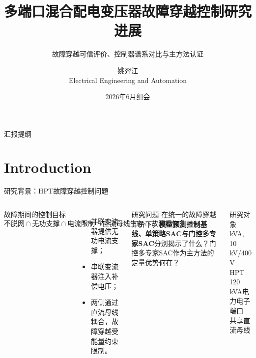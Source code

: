 \documentclass[10pt,aspectratio=169,mathserif]{beamer}
\title[HPT故障穿越控制]{多端口混合配电变压器故障穿越控制研究进展}
\subtitle{故障穿越可信评价、控制器谱系对比与主方法认证}
\author[Yijiang Yao]{姚羿江\\\medskip
{\small Electrical Engineering and Automation}}
\institute[ZJU]{浙江大学 \quad ZJU-UIUC Institute}
\date[June 2026]{2026年6月组会}
\begin{document}
\begin{frame}
  \titlepage
\end{frame}

\begin{frame}{汇报提纲}
  \tableofcontents
\end{frame}
\section{Introduction}

\begin{frame}{研究背景：HPT故障穿越控制问题}
\begin{columns}[T,onlytextwidth]
\begin{block}{故障期间的控制目标}
\[
\boxed{\text{不脱网}}
\cap
\boxed{\text{无功支撑}}
\cap
\boxed{\text{电流限制}}
\cap
\boxed{\text{直流母线生存}}
\cap
\boxed{\text{故障后恢复}}
\]
\end{block}

\begin{itemize}
  \item 并联变流器提供无功电流支撑；
  \item 串联变流器注入补偿电压；
  \item 两侧通过直流母线耦合，故障穿越受能量约束限制。
\end{itemize}

\begin{block}{研究问题}
在统一的故障穿越评价下，\textbf{模型预测控制基线、单策略SAC与门控多专家SAC}分别揭示了什么？门控多专家SAC作为主方法的定量优势何在？
\end{block}

\begin{block}{研究对象}
 kVA, 10 kV/400 V HPT\\
120 kVA电力电子端口\\
共享直流母线
\end{block}
\end{columns}
\end{frame}
\end{document}
